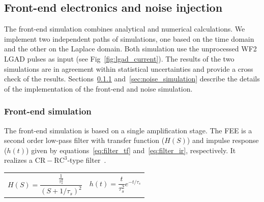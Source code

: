 \documentclass[preprint,1p]{elsarticle}
\begin{document}

\subsection{Front-end electronics and noise injection}
\label{sub_sec:fee_simulation_and_noise} The front-end simulation combines
analytical and numerical calculations. We implement two independent
paths of simulations, one based on the time domain and the other on the Laplace domain.
Both simulation use the unprocessed WF2 LGAD pulses as input (see Fig~\ref{fig:lgad_current}).
 The results of the two simulations are in agreement within statistical uncertainties and provide a
cross check of the results. Sections~\ref{sec:fee}
and~\ref{sec:noise_simulation} describe the details of the implementation of the
front-end and noise simulation. 

\subsubsection{Front-end simulation}\label{sec:fee}
The front-end simulation is based on a single amplification stage. 
The FEE is a second order low-pass filter with transfer function ($H(S)$)
and impulse response ($h(t)$) given by equations~\ref{eq:filter_tf} and~\ref{eq:filter_ir}, respectively.
It realizes a $\mathrm{CR-RC}^{3}$-type filter~\cite{}.

 \begin{tabularx}{\textwidth}{XX}
 \begin{equation}\label{eq:filter_tf}
   H(S) = \frac{\frac{1}{\tau_{s}^{2}}}{(S+1/\tau_{s})^{2}}
 \end{equation}
     &
 \begin{equation}\label{eq:filter_ir}
     h(t) = \frac{t}{\tau_s^2}e^{-t/\tau_{s}}
 \end{equation}
 \end{tabularx}\par
\end{document}
